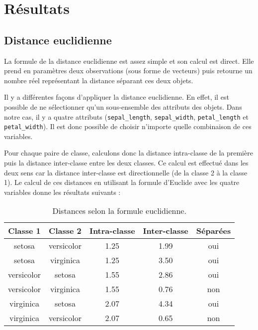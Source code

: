 \documentclass[french]{report}
\begin{document}
    \chapter{Résultats}
    
    \section{Distance euclidienne}
    
    La formule de la distance euclidienne est assez simple et son calcul est direct.
    Elle prend en paramètres deux observations (sous forme de vecteurs) puis retourne un nombre réel représentant la distance séparant ces deux objets.
    
    Il y a différentes façons d'appliquer la distance euclidienne.
    En effet, il est possible de ne sélectionner qu'un sous-ensemble des attributs des objets.
    Dans notre cas, il y a quatre attributs (\texttt{sepal\_length}, \texttt{sepal\_width}, \texttt{petal\_length} et \texttt{petal\_width}).
    Il est donc possible de choisir n'importe quelle combinaison de ces variables.
    
    Pour chaque paire de classe, calculons donc la distance intra-classe de la première puis la distance inter-classe entre les deux classes.
    Ce calcul est effectué dans les deux sens car la distance inter-classe est directionnelle (de la classe 2 à la classe 1).
    Le calcul de ces distances en utilisant la formule d'Euclide avec les quatre variables donne les résultats suivants :
    
    \begin{table}[h]
        \centering
        \begin{tabular}{||c c c c c||}
            \hline
            \textbf{Classe 1} & \textbf{Classe 2} & \textbf{Intra-classe} & \textbf{Inter-classe} & \textbf{Séparées} \\
            \hline\hline
            setosa & versicolor & 1.25 & 1.99 & {\color{ForestGreen}oui} \\
            setosa & virginica & 1.25 & 3.50 & {\color{ForestGreen}oui} \\
            \hline
            versicolor & setosa & 1.55 & 2.86 & {\color{ForestGreen}oui} \\
            versicolor & virginica & 1.55 & 0.76 & {\color{BrickRed}non} \\
            \hline
            virginica & setosa & 2.07 & 4.34 & {\color{ForestGreen}oui} \\
            virginica & versicolor & 2.07 & 0.65 & {\color{BrickRed}non} \\
            \hline
        \end{tabular}
        \caption{Distances selon la formule euclidienne.}
    \end{table}
    \leavevmode
    
\end{document}
